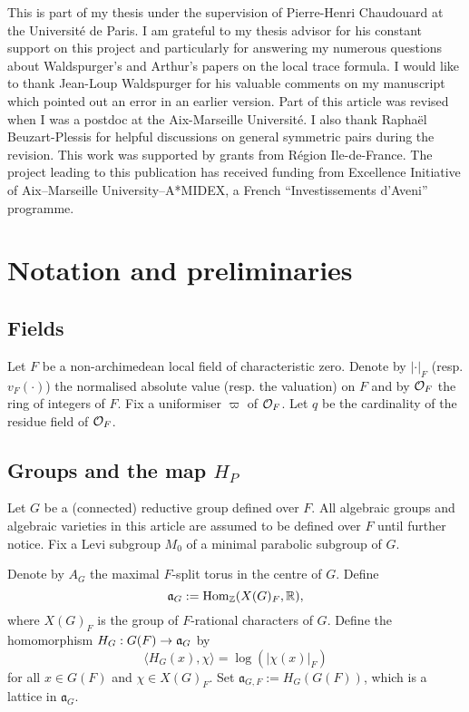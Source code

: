 \documentclass[a4paper]{amsart}
\newcommand{\fa}{{\mathfrak{a}}} \newcommand{\fb}{{\mathfrak{b}}}\newcommand{\fc}{{\mathfrak{c}}} \newcommand{\fd}{{\mathfrak{d}}}
\newcommand{\Hom}{{\mathrm{Hom}}}                    \newcommand{\hg}{{\mathrm {hg}}}
\theoremstyle{definition}
\theoremstyle{remark}
\numberwithin{equation}{subsection}
\begin{document}
This is part of my thesis under the supervision of Pierre-Henri Chaudouard at the Universit\'{e} de Paris. I am grateful to my thesis advisor for his constant support on this project and particularly for answering my numerous questions about Waldspurger's and Arthur's papers on the local trace formula. I would like to thank Jean-Loup Waldspurger for his valuable comments on my manuscript which pointed out an error in an earlier version. Part of this article was revised when I was a postdoc at the Aix-Marseille Université. I also thank Raphaël Beuzart-Plessis for helpful discussions on general symmetric pairs during the revision. This work was supported by grants from R\'{e}gion Ile-de-France. The project leading to this publication has received funding from Excellence Initiative of Aix–Marseille University–A*MIDEX, a French ``Investissements d’Aveni'' programme. 



\section{\textbf{Notation and preliminaries}}\label{secnot&pre}

\subsection{Fields}
Let $F$ be a non-archimedean local field of characteristic zero. Denote by $|\cdot|_F$ (resp. $v_F(\cdot)$) the normalised absolute value (resp. the valuation) on $F$ and by ${\mathcal {O}}_F$ the ring of integers of $F$. Fix a uniformiser $\varpi$ of ${\mathcal {O}}_F$. Let $q$ be the cardinality of the residue field of ${\mathcal {O}}_F$. 

\subsection{Groups and the map $H_P$}\label{gpandmap}
Let $G$ be a (connected) reductive group defined over $F$. All algebraic groups and algebraic varieties in this article are assumed to be defined over $F$ until further notice. Fix a Levi subgroup $M_0$ of a minimal parabolic subgroup of $G$. 

Denote by $A_G$ the maximal $F$-split torus in the centre of $G$. Define
$$ \fa_G:=\Hom_\BZ(X(G)_F, \BR), $$
where $X(G)_F$ is the group of $F$-rational characters of $G$. Define the homomorphism $H_G: G(F)\ra\fa_G$ by
$$ \langle H_G(x), \chi \rangle=\log(|\chi(x)|_F) $$
for all $x\in G(F)$ and $\chi\in X(G)_F$. Set $\fa_{G,F}:=H_G(G(F))$, which is a lattice in $\fa_G$. 
\end{document}
